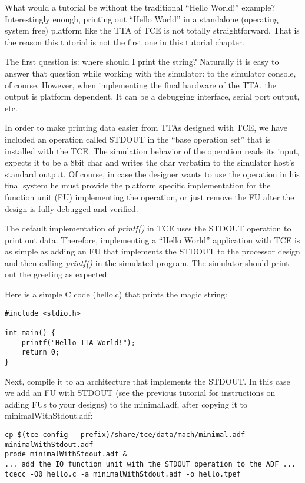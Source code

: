 \documentclass[twoside]{tceusermanual}
\begin{document}
What would a tutorial be without the traditional ``Hello World!''
example? Interestingly enough, printing out ``Hello World'' in a
standalone (operating system free) platform like the TTA of TCE is not 
totally straightforward. That is the reason this tutorial is not the first 
one in this tutorial chapter.

The first question is: where should I print the string? Naturally 
it is easy to answer that question while working with the simulator: to
the simulator console, of course. However, when implementing the final
hardware of the TTA, the output is platform dependent. It can be a
debugging interface, serial port output, etc.

In order to make printing data easier from TTAs designed
with TCE, we have included an operation called STDOUT in the ``base operation 
set'' that is installed with the TCE. The simulation behavior of the 
operation reads its input, expects it to be a 8bit char and writes the char
verbatim to the simulator host's standard output. Of course, in case the 
designer wants to use the operation in his final system he must provide the 
platform specific implementation for the function unit (FU) implementing the 
operation, or just remove the FU after the design is fully debugged and
verified.

The default implementation of \textit{printf()} in TCE uses the STDOUT
operation to print out data. Therefore, implementing a ``Hello World''
application with TCE is as simple as adding an FU that implements
the STDOUT to the processor design and then calling \textit{printf()} in
the simulated program. The simulator should print out the greeting
as expected.

Here is a simple C code (hello.c) that prints the magic string:

\begin{verbatim}
#include <stdio.h>

int main() {
    printf("Hello TTA World!");
    return 0;
}
\end{verbatim}

Next, compile it to an architecture that implements the
STDOUT. In this case we add an FU with STDOUT (see the previous
tutorial for instructions on adding FUs to your designs) to the minimal.adf, 
after copying it to minimalWithStdout.adf:

\begin{verbatim}
cp $(tce-config --prefix)/share/tce/data/mach/minimal.adf minimalWithStdout.adf
prode minimalWithStdout.adf &
... add the IO function unit with the STDOUT operation to the ADF ...
tcecc -O0 hello.c -a minimalWithStdout.adf -o hello.tpef
\end{verbatim}
\end{document}
